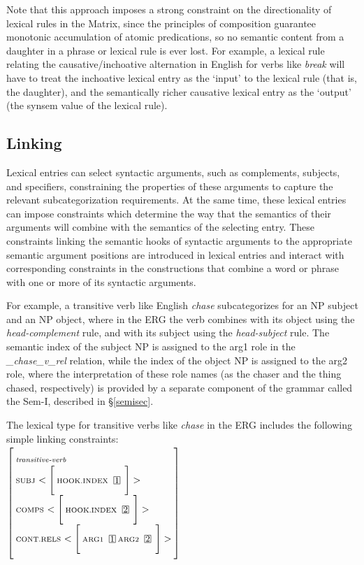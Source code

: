 \documentclass[12pt]{article}
\newcommand{\avmplus}[1]{{\setlength{\arraycolsep}{0.8mm}	
                       \renewcommand{\arraystretch}{1.1} %
                       \left[ 			
                       \begin{array}{l}
                       \\[-2mm] #1 \\[-2mm] \\
                       \end{array} 		
                       \right]
                    }}
\newcommand{\att}[1]{{\mbox{\scriptsize {\bf #1}}}}
\newcommand{\attval}[2]{{\mbox{\scriptsize #1}\ {{#2}}}}
\newcommand{\attvallist}[2]{{\mbox{\scriptsize #1}\ {<{#2}>}}}
\newcommand{\ind}[1]{{\setlength{\fboxsep}{0.25mm} \: \fbox{{\small #1}} \:}}
\begin{document}
Note that this approach imposes a strong constraint on the
directionality of lexical rules in the Matrix, since the principles of
composition guarantee monotonic accumulation of atomic predications,
so no semantic content from a daughter in a phrase or lexical rule is
ever lost.  For example, a lexical rule relating the
causative/inchoative alternation in English for verbs like {\it break}
will have to treat the inchoative lexical entry as the `input' to the
lexical rule (that is, the daughter), and the semantically richer
causative lexical entry as the `output' (the {\sc synsem} value of the
lexical rule).


\subsection{Linking}
\label{linksec}

Lexical entries can select syntactic arguments, such as complements, subjects,
and specifiers, constraining the properties of these arguments to capture the
relevant subcategorization requirements.  At the same time, these lexical
entries can impose constraints which determine the way that the semantics of 
their arguments will combine with the semantics of the selecting entry.
These constraints linking the semantic hooks of syntactic arguments to the
appropriate semantic argument positions are introduced in lexical entries
and interact with corresponding constraints in the constructions
that combine a word or phrase with one or more of its syntactic arguments.

For example, a transitive verb like English {\it chase} subcategorizes for an 
NP subject and an NP object, where in the ERG the verb combines with its 
object using the {\it head-complement} rule, and with its subject using the
{\it head-subject} rule.  The semantic index of the subject NP is assigned
to the {\sc arg1} role in the {\it \_chase\_v\_rel} relation, while the index of
the object NP is assigned to the {\sc arg2} role, where the interpretation
of these role names (as the chaser and the thing chased, respectively) is
provided by a separate component of the grammar called the Sem-I, described
in \S\ref{semisec}.

The lexical type for transitive verbs like {\it chase} in the ERG includes the 
following simple linking constraints:\\

$\avmplus{\att{\it transitive-verb}\\
          \attvallist{SUBJ}{
          \avmplus{\attval{HOOK.INDEX}{\ind{1}}}}\\
          \attvallist{COMPS}{
          \avmplus{\attval{HOOK.INDEX}{\ind{2}}}}\\
          \attvallist{CONT.RELS}{
          \avmplus{\attval{ARG1}{\ind{1}}
                   \attval{ARG2}{\ind{2}}}}}$\\
\end{document}
